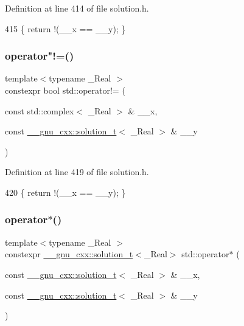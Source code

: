 Definition at line 414 of file solution.\+h.


\begin{DoxyCode}
415     \{ \textcolor{keywordflow}{return} !(\_\_x == \_\_y); \}
\end{DoxyCode}
\mbox{\label{namespacestd_ad62f982d25741aa725c67cb3380782d9}} 
\subsubsection{\texorpdfstring{operator"!=()}{operator!=()}\hspace{0.1cm}{\footnotesize\ttfamily [5/5]}}
{\footnotesize\ttfamily template$<$typename \+\_\+\+Real $>$ \\
constexpr bool std\+::operator!= (\begin{DoxyParamCaption}\item[{const std\+::complex$<$ \+\_\+\+Real $>$ \&}]{\+\_\+\+\_\+x,  }\item[{const \hyperlink{namespace____gnu__cxx_ae20ea642de50eb361074c62676b0159c}{\+\_\+\+\_\+gnu\+\_\+cxx\+::solution\+\_\+t}$<$ \+\_\+\+Real $>$ \&}]{\+\_\+\+\_\+y }\end{DoxyParamCaption})}



Definition at line 419 of file solution.\+h.


\begin{DoxyCode}
420     \{ \textcolor{keywordflow}{return} !(\_\_x == \_\_y); \}
\end{DoxyCode}
\mbox{\label{namespacestd_afe761665ed44abc2edacac26cb45c645}} 
\subsubsection{\texorpdfstring{operator$\ast$()}{operator*()}\hspace{0.1cm}{\footnotesize\ttfamily [1/5]}}
{\footnotesize\ttfamily template$<$typename \+\_\+\+Real $>$ \\
constexpr \hyperlink{namespace____gnu__cxx_ae20ea642de50eb361074c62676b0159c}{\+\_\+\+\_\+gnu\+\_\+cxx\+::solution\+\_\+t}$<$\+\_\+\+Real$>$ std\+::operator$\ast$ (\begin{DoxyParamCaption}\item[{const \hyperlink{namespace____gnu__cxx_ae20ea642de50eb361074c62676b0159c}{\+\_\+\+\_\+gnu\+\_\+cxx\+::solution\+\_\+t}$<$ \+\_\+\+Real $>$ \&}]{\+\_\+\+\_\+x,  }\item[{const \hyperlink{namespace____gnu__cxx_ae20ea642de50eb361074c62676b0159c}{\+\_\+\+\_\+gnu\+\_\+cxx\+::solution\+\_\+t}$<$ \+\_\+\+Real $>$ \&}]{\+\_\+\+\_\+y }\end{DoxyParamCaption})}

